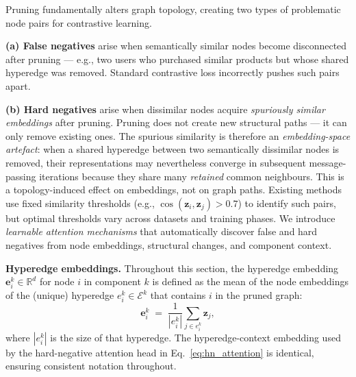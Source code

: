 \documentclass[10pt]{article}
\theoremstyle{plain}
\theoremstyle{definition}
\begin{document}
Pruning fundamentally alters graph topology, creating two types of problematic node pairs for contrastive learning.

\textbf{(a) False negatives} arise when semantically similar nodes become disconnected after pruning --- e.g., two users who purchased similar products but whose shared hyperedge was removed. Standard contrastive loss incorrectly pushes such pairs apart.

\textbf{(b) Hard negatives} arise when dissimilar nodes acquire \emph{spuriously similar embeddings} after pruning. Pruning does not create new structural paths --- it can only remove existing ones. The spurious similarity is therefore an \emph{embedding-space artefact}: when a shared hyperedge between two semantically dissimilar nodes is removed, their representations may nevertheless converge in subsequent message-passing iterations because they share many \emph{retained} common neighbours. This is a topology-induced effect on embeddings, not on graph paths. Existing methods use fixed similarity thresholds (e.g., $\cos(\mathbf{z}_i,\mathbf{z}_j)>0.7$) to identify such pairs, but optimal thresholds vary across datasets and training phases. We introduce \emph{learnable attention mechanisms} that automatically discover false and hard negatives from node embeddings, structural changes, and component context.

\textbf{Hyperedge embeddings.} Throughout this section, the hyperedge embedding $\mathbf{e}_i^{k}\in\mathbb{R}^{d}$ for node $i$ in component $k$ is
defined as the mean of the node embeddings of the (unique) hyperedge $e_i^{k}\in\mathcal{E}^{k}$ that contains $i$ in the pruned graph:
\begin{equation}
\mathbf{e}_i^{k} \;=\;
\frac{1}{|e_i^{k}|}\sum_{j\in e_i^{k}}\mathbf{z}_j,
\label{eq:hyperedge_emb}
\end{equation}
where $|e_i^{k}|$ is the size of that hyperedge. The hyperedge-context embedding used by the hard-negative attention head
in Eq.~\eqref{eq:hn_attention} is identical, ensuring consistent notation throughout.
\end{document}
